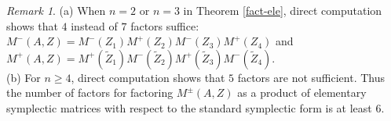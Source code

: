 \documentclass[10pt]{amsart}
\theoremstyle{remark}
\newtheorem{rema}[theo]{Remark}
\begin{document}
\begin{rema}\label{fact-num-theo1}
    (a) When $n=2$ or $n=3$ in Theorem \ref{fact-ele}, direct computation shows that $4$ instead of $7$ factors suffice: $M^-(A, Z) = 
        M^-(Z_1) M^+(Z_2) M^-(Z_3) M^+(Z_4)$ and $M^+(A, Z) = 
        M^+(\tilde{Z}_1) M^-(\tilde{Z}_2) M^+(\tilde{Z}_3) M^-(\tilde{Z}_4)$. \\
    (b) For $n \ge 4$, direct computation shows that $5$ factors are not sufficient. Thus the number of factors for factoring $M^\pm(A, Z)$ as a product of elementary symplectic matrices with respect to the standard symplectic form is at least $6$. 
\end{rema}
    
\end{document}
